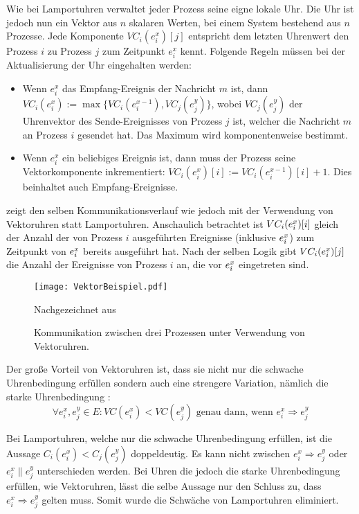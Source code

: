 Wie bei Lamportuhren verwaltet jeder Prozess seine eigne lokale Uhr.
Die Uhr ist jedoch nun ein Vektor aus $n$ skalaren Werten, bei einem System bestehend aus $n$ Prozesse.
Jede Komponente $VC_i(e_i^x)[j]$ entspricht dem letzten Uhrenwert den Prozess $i$ zu Prozess $j$ zum Zeitpunkt $e_i^x$ kennt.
Folgende Regeln müssen bei der Aktualisierung der Uhr eingehalten werden:
\begin{itemize}
    \item Wenn $e_i^x$ das Empfang-Ereignis der Nachricht $m$ ist, dann $VC_i(e_i^x):=\max\{ VC_i(e_i^{x-1}), VC_j(e_j^y) \}$, wobei $VC_j(e_j^y)$ der Uhrenvektor des Sende-Ereignisses von Prozess $j$ ist, welcher die Nachricht $m$ an Prozess $i$ gesendet hat. Das Maximum wird komponentenweise bestimmt.
    \item Wenn $e_i^x$ ein beliebiges Ereignis ist, dann muss der Prozess seine Vektorkomponente inkrementiert: $VC_i(e_i^x)[i]:=VC_i(e_i^{x-1})[i] + 1$. Dies beinhaltet auch Empfang-Ereignisse.
\end{itemize}

 zeigt den selben Kommunikationsverlauf wie  jedoch mit der Verwendung von Vektoruhren statt Lamportuhren.
Anschaulich betrachtet ist $VC_i(e_i^x)[i]$ gleich der Anzahl der von Prozess $i$ ausgeführten Ereignisse (inklusive $e_i^x$) zum Zeitpunkt von $e_i^x$ bereits ausgeführt hat.
Nach der selben Logik gibt $VC_i(e_i^x)[j]$ die Anzahl der Ereignisse von Prozess $i$ an, die vor $e_i^x$ eingetreten sind.

\begin{figure}[ht]
    \centering
    \texttt{[image: VektorBeispiel.pdf]}
    \caption[Exemplarische Kommunikation mit Vektoruhren]{Kommunikation zwischen drei Prozessen unter Verwendung von Vektoruhren.}
    Nachgezeichnet aus  \cite{landes2006dynamic}
    \label{fig:VektorBsp}
\end{figure}

Der große Vorteil von Vektoruhren ist, dass sie nicht nur die schwache Uhrenbedingung erfüllen sondern auch eine strengere Variation, nämlich die starke Uhrenbedingung \cite{Lamport1978}:
\begin{equation*}
\forall e_i^x, e_j^y \in E \colon VC(e_i^x) < VC(e_j^y) \text{ genau dann, wenn } e_i^x \Rightarrow e_j^y
\end{equation*}

Bei Lamportuhren, welche nur die schwache Uhrenbedingung erfüllen, ist die Aussage $C_i(e_i^x)<C_j(e_j^y)$ doppeldeutig. 
Es kann nicht zwischen $e_i^x \Rightarrow e_j^y$ oder $e_i^x \parallel e_j^y$ unterschieden werden.
Bei Uhren die jedoch die starke Uhrenbedingung erfüllen, wie Vektoruhren, lässt die selbe Aussage nur den Schluss zu, dass $e_i^x \Rightarrow e_j^y$ gelten muss.
Somit wurde die Schwäche von Lamportuhren eliminiert.

